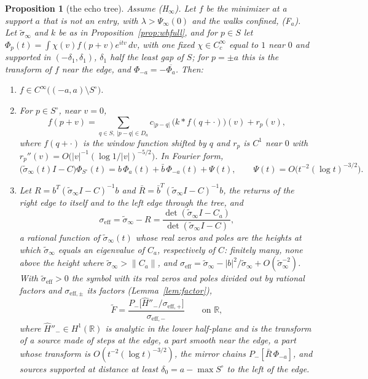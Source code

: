 \documentclass[11pt]{article}
\newtheorem{proposition}[theorem]{Proposition}
\theoremstyle{definition}
\theoremstyle{remark}
\newcommand{\R}{\mathbb{R}}
\begin{document}
\begin{proposition}[the echo tree]\label{prop:tree}
Assume (H$_\infty$). Let $f$ be the minimizer at a support $a$ that is not an entry, with $\lambda>\Psi_\infty(0)$ and the walks confined, (F$_a$). Let $\tilde\sigma_\infty$ and $k$ be as in Proposition~\ref{prop:whfull}, and for $p\in S$ let $\Phi_p(t)=\int\chi(v)f(p+v)e^{itv}\,dv$, with one fixed $\chi\in C_c^\infty$ equal to $1$ near $0$ and supported in $(-\delta_1,\delta_1)$, $\delta_1$ half the least gap of $S$; for $p=\pm a$ this is the transform of $f$ near the edge, and $\Phi_{-a}=-\overline{\Phi_a}$. Then:
\begin{enumerate}
\item[(i)] $f\in C^\infty\big((-a,a)\setminus S^\circ\big)$.
\item[(ii)] For $p\in S^\circ$, near $v=0$,
\begin{equation}\label{eq:localecho}
f(p+v)=\sum_{q\in S,\ |p-q|\in D_a}c_{|p-q|}\,\big(k*f(q+\cdot)\big)(v)+r_p(v),
\end{equation}
where $f(q+\cdot)$ is the window function shifted by $q$ and $r_p$ is $C^1$ near $0$ with $r_p''(v)=O\big(|v|^{-1}(\log1/|v|)^{-5/2}\big)$. In Fourier form,
\begin{equation}\label{eq:treesystem}
\big(\tilde\sigma_\infty(t)I-C\big)\Phi_{S^\circ}(t)=b\,\Phi_a(t)+\bar b\,\Phi_{-a}(t)+\Psi(t),\qquad \Psi(t)=O\big(t^{-2}(\log t)^{-3/2}\big).
\end{equation}
\item[(iii)] Let $R=b^{T}(\tilde\sigma_\infty I-C)^{-1}b$ and $\bar R=\bar b^{T}(\tilde\sigma_\infty I-C)^{-1}b$, the returns of the right edge to itself and to the left edge through the tree, and
\begin{equation}\label{eq:sigmatree}
\sigma_{\mathrm{eff}}=\tilde\sigma_\infty-R=\frac{\det(\tilde\sigma_\infty I-C_a)}{\det(\tilde\sigma_\infty I-C)},
\end{equation}
a rational function of $\tilde\sigma_\infty(t)$ whose real zeros and poles are the heights at which $\tilde\sigma_\infty$ equals an eigenvalue of $C_a$, respectively of $C$: finitely many, none above the height where $\tilde\sigma_\infty>\|C_a\|$, and $\sigma_{\mathrm{eff}}=\tilde\sigma_\infty-|b|^2/\tilde\sigma_\infty+O(\tilde\sigma_\infty^{-2})$. With $\tilde\sigma_{\mathrm{eff}}>0$ the symbol with its real zeros and poles divided out by rational factors and $\sigma_{\mathrm{eff},\pm}$ its factors (Lemma~\ref{lem:factor}),
\begin{equation}\label{eq:whtree}
\tilde F=\frac{P_-\big[\hat H''_-/\sigma_{\mathrm{eff},+}\big]}{\sigma_{\mathrm{eff},-}}\qquad\text{on }\R ,
\end{equation}
where $\hat H''_-\in H^1(\R)$ is analytic in the lower half-plane and is the transform of a source made of steps at the edge, a part smooth near the edge, a part whose transform is $O(t^{-2}(\log t)^{-3/2})$, the mirror chains $P_-[\bar R\,\Phi_{-a}]$, and sources supported at distance at least $\delta_0=a-\max S^\circ$ to the left of the edge.
\end{enumerate}
\end{proposition}
\end{document}
